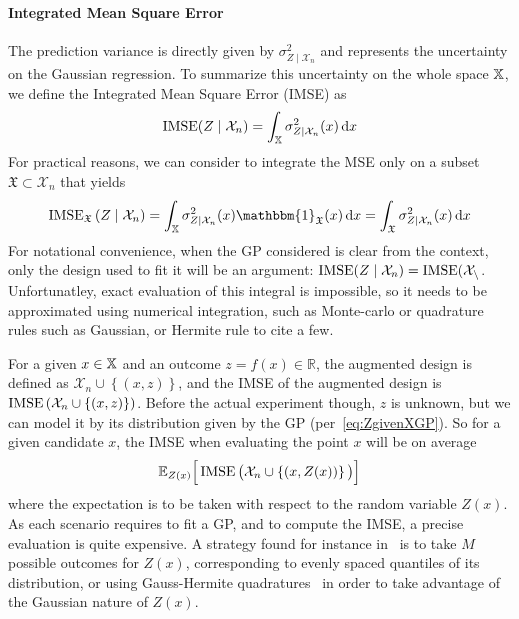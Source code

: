 \documentclass[../../Main_ManuscritThese.tex]{subfiles}
\begin{document}
\paragraph{Integrated Mean Square Error}
The prediction variance is directly given by
$\sigma^2_{Z\mid \mathcal{X}_n}$ and represents the uncertainty on the
Gaussian regression. To summarize this uncertainty on the whole space
$\mathbb{X}$, we define the Integrated Mean Square Error
(IMSE)\citep{sacks_designs_1989} as
\begin{equation}
  \operatorname{\mathrm{IMSE}}(Z \mid \mathcal{X}_n) = \int_{\mathbb{X}} \sigma_{Z\mid\mathcal{X}_n}^2(x)\,\mathrm{d}x
\end{equation}
For practical reasons, we can consider to integrate the MSE only on a
subset $\mathfrak{X}\subset \mathcal{X}_n$ that yields
\begin{equation}
  \IMSE_{\mathfrak{X}}\left(Z \mid \mathcal{X}_n \right) = \int_{\Xspace} \sigma^2_{Z\mid \mathcal{X}_n}(x)  \mathbbm{1}_{\mathfrak{X}}(x)\,\mathrm{d}x = \int_{\mathfrak{X}} \sigma^2_{Z\mid \mathcal{X}_n}(x)\,\mathrm{d}x
\end{equation}
For notational convenience, when the GP considered is clear from the
context, only the design used to fit it will be an argument:
$\operatorname{\mathrm{IMSE}}(Z \mid \mathcal{X}_n) = \operatorname{\mathrm{IMSE}}(\mathcal{X_n}$.  Unfortunatley, 
exact evaluation of this integral is impossible, so it needs to be
approximated using numerical integration, such as Monte-carlo or
quadrature rules such as Gaussian, or Hermite rule to cite a
few.%


For a given $x\in \mathbb{X}$ and an outcome $z=f(x)\in \mathbb{R}$, the
augmented design is defined as
$\mathcal{X}_n \cup \left\{(x, z)\right\}$, and the IMSE of the
augmented design is
$\operatorname{\mathrm{IMSE}}\left(\mathcal{X}_n \cup \left\{(x, z)\right\} \right)$.
Before the actual experiment though, $z$ is unknown, but we can model
it by its distribution given by the GP (per~\cref{eq:ZgivenXGP}). So
for a given candidate $x$, the IMSE when evaluating the point $x$ will
be on average
\begin{equation}
  \label{eq:IMSE_augmented}
  \mathbb{E}_{Z(x)}\Big[\operatorname{\mathrm{IMSE}}\big(\mathcal{X}_n \cup \left\{(x, Z(x))\right\} \big)\Big]
\end{equation}
where the expectation is to be taken with respect to the random
variable $Z(x)$. As each scenario requires to fit a GP, and to compute
the IMSE, a precise evaluation is quite expensive. A strategy found
for instance in~\cite{villemonteix_informational_2006} is to take $M$
possible outcomes for $Z(x)$, corresponding to evenly spaced quantiles
of its distribution, or using Gauss-Hermite
quadratures~\citep{bernard_methodes_2019} in order to take advantage of
the Gaussian nature of $Z(x)$.
\end{document}
